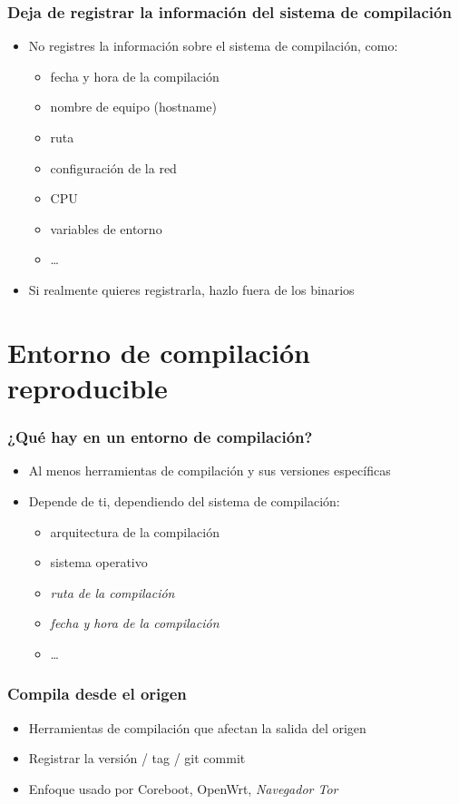 \documentclass[14pt,aspectratio=169]{beamer}
\begin{document}
\begin{frame}
 \frametitle{Deja de registrar la información del sistema de compilación}

 \begin{itemize}
  \item No registres la información sobre el sistema de compilación, como:
   \begin{itemize}
    \item fecha y hora de la compilación
    \item nombre de equipo (hostname)
    \item ruta
    \item configuración de la red
    \item CPU
    \item variables de entorno
    \item …
   \end{itemize}
  \item<2> Si realmente quieres registrarla, hazlo fuera de los binarios
 \end{itemize}
\end{frame}

\section{Entorno de compilación reproducible}

\begin{frame}
 \frametitle{¿Qué hay en un entorno de compilación?}

 \begin{itemize}
  \item Al menos herramientas de compilación y sus versiones específicas
  \item<2> Depende de ti, dependiendo del sistema de compilación:
   \begin{itemize}
    \item arquitectura de la compilación
    \item sistema operativo
    \item \textit{ruta de la compilación}
    \item \textit{fecha y hora de la compilación}
    \item …
   \end{itemize}
 \end{itemize}
\end{frame}

\begin{frame}
 \frametitle{Compila desde el origen}

 \begin{itemize}
  \item Herramientas de compilación que afectan la salida del origen
  \item Registrar la versión / tag / git commit
  \item Enfoque usado por Coreboot, OpenWrt, \textit{Navegador Tor}
 \end{itemize}
\end{frame}
\end{document}
